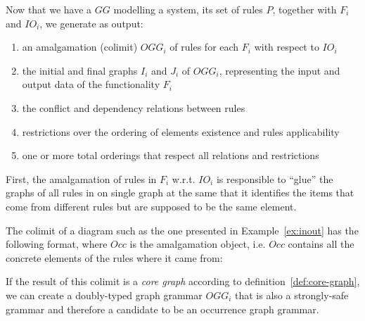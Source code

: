 Now that we have a $GG$ modelling a system, its set of rules $P$, together with $F_i$ and $IO_i$, we generate as output:

\begin{enumerate}
\item an amalgamation (colimit) $OGG_i$ of rules for each $F_i$ with respect to $IO_i$
\item the initial and final graphs $I_i$ and $J_i$ of $OGG_i$, representing the input and output data of the functionality $F_i$
\item the conflict and dependency relations between rules 
\item restrictions over the ordering of elements existence and rules applicability
\item one or more total orderings that respect all relations and restrictions
\end{enumerate}

First, the amalgamation of rules in $F_i$ w.r.t. $IO_i$ is responsible to ``glue'' the graphs of all rules in on single graph at the same that it identifies the items that come from different rules but are supposed to be the same element.

The colimit of a diagram such as the one presented in Example~\ref{ex:inout} has the following format, where $Occ$ is the amalgamation object, i.e. $Occ$ contains all the concrete elements of the rules where it came from:

\hfill\break

If the result of this colimit is a \emph{core graph} according to definition~\ref{def:core-graph}, we can create a doubly-typed graph grammar $OGG_i$ that is also a strongly-safe grammar and therefore a candidate to be an occurrence graph grammar.

